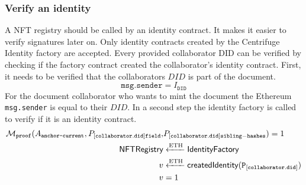 \subsubsection{Verify an identity}
A NFT registry should be called by an identity contract. It makes it easier to verify signatures later on. Only identity contracts created by the Centrifuge Identity factory are accepted. Every provided collaborator DID can be verified by checking if the factory contract created the collaborator's identity contract. First, it needs to be verified that the collaborators $DID$ is part of the document.
\begin{equation}
\mathtt{msg.sender} = I_{\mathtt{DID}}
\end{equation}
For the document collaborator who wants to mint the document the Ethereum \texttt{msg.sender} is equal to their $DID$. In a second step the identity factory is called to verify if it is an identity contract.
\begin{equation}
\begin{split}
\mathcal{M}_{\texttt{proof}}(A_{\texttt{anchor-current}} ,P_{[\mathtt{collaborator.did}]\mathtt{field}}, &P_{[\mathtt{collaborator.did}]\mathtt{sibling-hashes}})  = 1 \\
\mathsf{NFTRegistry} &\xleftarrow[]{\text{ETH}}  \mathsf{IdentityFactory} \\
v &\xleftarrow[]{\text{ETH}} \textsf{createdIdentity}(\mathtt{P_{[\mathtt{collaborator.did}]}}) \\
v & = 1 \\
\end{split}
\end{equation}


